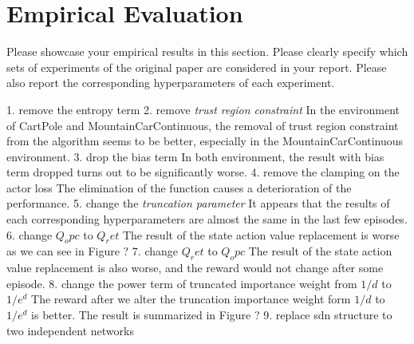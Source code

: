 \section{Empirical Evaluation}
\label{section:evaluation}
Please showcase your empirical results in this section. Please clearly specify which sets of experiments of the original paper are considered in your report. Please also report the corresponding hyperparameters of each experiment.


1. remove the entropy term
2. remove \emph{trust region constraint}
In the environment of CartPole and MountainCarContinuous, the removal of trust region constraint from the algorithm seems to be better, especially in the MountainCarContinuous environment.
3. drop the bias term 
In both environment, the result with bias term dropped turns out to be significantly worse.
4. remove the clamping on the actor loss
The elimination of the function causes a deterioration of the performance. 
5. change the \emph{truncation parameter}
It appears that the results of each corresponding hyperparameters are almost the same in the last few episodes.
6. change $Q_opc$ to $Q_ret$ 
The result of the state action value replacement is worse as we can see in Figure ? 
7. change $Q_ret$ to $Q_opc$
The result of the state action value replacement is also worse, and the reward would not change after some episode.
8. change the power term of truncated importance weight from $1/d$ to $1 / e^d$
The reward after we alter the truncation importance weight form $1/d$ to $1 / e^d$ is better. The result is summarized in Figure ?
9. replace sdn structure to two independent networks